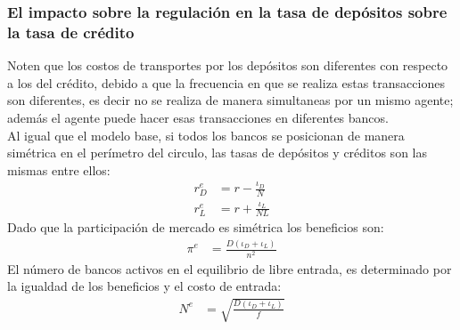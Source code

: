 \documentclass[10pt, xcolor=table, x11names]{beamer}
\begin{document}
\begin{frame}
    \frametitle{{\normalsize El impacto sobre la regulación en la tasa de depósitos sobre la tasa de crédito} {}}
    Noten que los costos de transportes por los depósitos son diferentes con respecto a los del crédito, debido a que la frecuencia en que se realiza estas transacciones son diferentes, es decir no se realiza de manera simultaneas por un mismo agente; además el agente puede hacer esas transacciones en diferentes bancos. \\
    Al igual que el modelo base, si todos los bancos se posicionan de manera simétrica en el perímetro del circulo, las tasas de depósitos y créditos son las mismas entre ellos:
      \begin{align}
      r_{D}^{e}&=r-\frac{\iota_{D}}{N} \\
      r_{L}^{e}&=r+\frac{\iota_{L}}{NL} 
      \end{align} 
    Dado que la participación de mercado es simétrica los beneficios son:
     \begin{align}
     \pi^{e}&=\frac{D(\iota_{D}+\iota_{L})}{n^{2}}
     \end{align} 
     El número de bancos activos en el equilibrio de libre entrada, es determinado por la igualdad de los beneficios y el costo de entrada:
     \begin{align}
     N^{e}&=\sqrt{\frac{D(\iota_{D}+\iota_{L})}{f}}
     \end{align} 
     
     
\end{frame}
\end{document}
